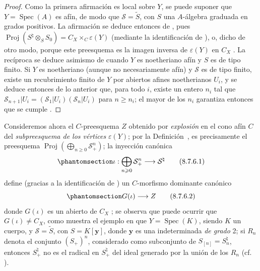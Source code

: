 \documentclass[oneside,10pt]{amsart}
\newcommand{\oldpage}[2][]{\marginnote{\normalfont\footnotesize\textbf{#1}~|~#2}\ignorespaces}
\let\EGAOriginalLabel\label
\renewcommand{\label}[1]{\phantomsection\EGAOriginalLabel{#1}}
\begin{document}
\begin{proof}
Como la primera afirmación es local sobre $Y$, se puede suponer que $Y=\operatorname{Spec}(A)$ es afín, de modo que $\mathcal{S}=\widetilde{S}$, con $S$ una $A$-álgebra graduada en grados positivos.
La afirmación se deduce entonces de , pues $\operatorname{Proj}(S^{\natural}\otimes_S S_0)=
C_X\times_C\varepsilon(Y)$ (mediante la identificación de ), o, dicho de otro modo, porque este preesquema es la imagen inversa de $\varepsilon(Y)$ en $C_X$ .
La recíproca se deduce asimismo de  cuando $Y$ es noetheriano afín y $S$ es de tipo finito.
\oldpage[II]{177}
Si $Y$ es noetheriano (aunque no necesariamente afín) y $\mathcal{S}$ es de tipo finito, existe un recubrimiento finito de $Y$ por abiertos afines noetherianos $U_i$, y se deduce entonces de lo anterior que, para todo $i$, existe un entero $n_i$ tal que $\mathcal{S}_{n+1}|U_i=(\mathcal{S}_1|U_i)(\mathcal{S}_n|U_i)$ para $n\geqslant n_i$;
el mayor de los $n_i$ garantiza entonces que se cumple .
\end{proof}
\begin{env}[8.7.6]
\label{II.8.7.6-fr}
Consideremos ahora el $C$-preesquema $Z$ obtenido por \emph{explosión} en el cono afín $C$ del \emph{subpreesquema de los vértices} $\varepsilon(Y)$;
por la Definición~, es precisamente el preesquema $\operatorname{Proj}(\bigoplus_{n\geqslant 0}\mathcal{S}_+^n)$;
la inyección canónica
\begin{equation}
\label{II.8.7.6.1-fr}
  \iota:\bigoplus_{n\geqslant 0}\mathcal{S}_+^n
  \longrightarrow\mathcal{S}^{\natural}
\tag{8.7.6.1}
\end{equation}
define (gracias a la identificación de ) un $C$-morfismo dominante canónico
\begin{equation}
\label{II.8.7.6.2-fr}
  G(\iota)\longrightarrow Z
\tag{8.7.6.2}
\end{equation}
donde $G(\iota)$ es un abierto de $C_X$ ;
se observa que puede ocurrir que $G(\iota)\ne C_X$, como muestra el ejemplo en que $Y=\operatorname{Spec}(K)$, siendo $K$ un cuerpo, y $\mathcal{S}=\widetilde{S}$, con $S=K[\mathbf{y}]$, donde $\mathbf{y}$ es una indeterminada \emph{de grado} 2;
si $R_n$ denota el conjunto $(S_+)^n$, considerado como subconjunto de $S_{[n]}=S_n^{\natural}$, entonces $S_+^{\natural}$ no es el radical en $S_+^{\natural}$ del ideal generado por la unión de los $R_n$ (cf. ).
\end{env}
\end{document}
